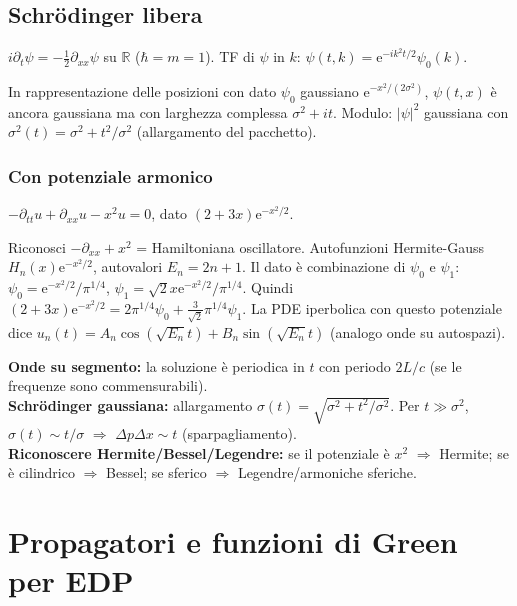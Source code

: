 \documentclass[11pt,a4paper,openany]{book}
\theoremstyle{definition}
\newcommand{\R}{\mathbb{R}}
\newcommand{\eu}{\mathrm{e}}
\begin{document}
\section{Schr\"odinger libera}

\begin{teoria}
$i\partial_t\psi=-\tfrac{1}{2}\partial_{xx}\psi$ su $\R$ ($\hbar=m=1$). TF di $\psi$ in $k$: $\psi(t,k)=\eu^{-ik^2 t/2}\psi_0(k)$.

In rappresentazione delle posizioni con dato $\psi_0$ gaussiano $\eu^{-x^2/(2\sigma^2)}$, $\psi(t,x)$ \`e ancora gaussiana ma con larghezza complessa $\sigma^2+it$. Modulo: $|\psi|^2$ gaussiana con $\sigma^2(t)=\sigma^2+t^2/\sigma^2$ (allargamento del pacchetto).
\end{teoria}

\subsection{Con potenziale armonico}
\begin{esempio}[Scritto 08/09/2025, Es. 4]
$-\partial_{tt}u+\partial_{xx}u-x^2 u=0$, dato $(2+3x)\eu^{-x^2/2}$.

Riconosci $-\partial_{xx}+x^2$ = Hamiltoniana oscillatore. Autofunzioni Hermite-Gauss $H_n(x)\eu^{-x^2/2}$, autovalori $E_n=2n+1$. Il dato \`e combinazione di $\psi_0$ e $\psi_1$:
$\psi_0=\eu^{-x^2/2}/\pi^{1/4}$, $\psi_1=\sqrt 2 x\eu^{-x^2/2}/\pi^{1/4}$.
Quindi $(2+3x)\eu^{-x^2/2}=2\pi^{1/4}\psi_0+\frac{3}{\sqrt 2}\pi^{1/4}\psi_1$.
La PDE iperbolica con questo potenziale dice $u_n(t)=A_n\cos(\sqrt{E_n}t)+B_n\sin(\sqrt{E_n}t)$ (analogo onde su autospazi).
\end{esempio}

\begin{trucco}
\textbf{Onde su segmento:} la soluzione \`e periodica in $t$ con periodo $2L/c$ (se le frequenze sono commensurabili).\\
\textbf{Schr\"odinger gaussiana:} allargamento $\sigma(t)=\sqrt{\sigma^2+t^2/\sigma^2}$. Per $t\gg\sigma^2$, $\sigma(t)\sim t/\sigma$ $\Rightarrow$ $\Delta p\Delta x\sim t$ (sparpagliamento).\\
\textbf{Riconoscere Hermite/Bessel/Legendre:} se il potenziale \`e $x^2$ $\Rightarrow$ Hermite; se \`e cilindrico $\Rightarrow$ Bessel; se sferico $\Rightarrow$ Legendre/armoniche sferiche.
\end{trucco}

\chapter{Propagatori e funzioni di Green per EDP}\label{ch:propagatori}
\end{document}
